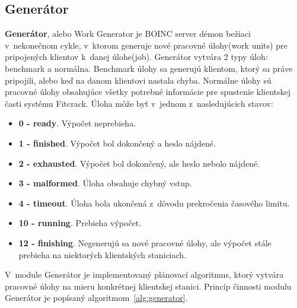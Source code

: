 \subsection{Generátor}
\label{generator}
\textbf{Generátor}, alebo Work Generator je BOINC server démon bežiaci v~nekonečnom cykle, v~ktorom generuje nové pracovné úlohy(work units) pre pripojených klientov k~danej úlohe(job).
Generátor vytvára 2 typy úloh: benchmark a normálna.
Benchmark úlohy sa generujú klientom, ktorý sa práve pripojili, alebo keď na danom klientovi nastala chyba.
Normálne úlohy sú pracovné úlohy obsahujúce všetky potrebné informácie pre spustenie klientskej časti systému Fitcrack.
Úloha môže byť v~jednom z~nasledujúcich stavov:
\begin{itemize}
	\item \textbf{0 - ready}. Výpočet neprebieha.
	\item \textbf{1 - finished}. Výpočet bol dokončený a heslo nájdené.
	\item \textbf{2 - exhausted}. Výpočet bol dokončený, ale heslo nebolo nájdené.
	\item \textbf{3 - malformed}. Úloha obsahuje chybný vstup.
	\item \textbf{4 - timeout}. Úloha bola ukončená z~dôvodu prekročenia časového limitu.
	\item \textbf{10 - running}. Prebieha výpočet.
	\item \textbf{12 - finishing}. Negenerujú sa nové pracovné úlohy, ale výpočet stále prebieha na niektorých klientských staniciach.
\end{itemize}
V~module Generátor je implementovaný plánovací algoritmus, ktorý vytvára pracovné úlohy na mieru konkrétnej klientskej stanici.
Princíp činnosti modulu Generátor je popísaný algoritmom~\ref{alg:generator}.

